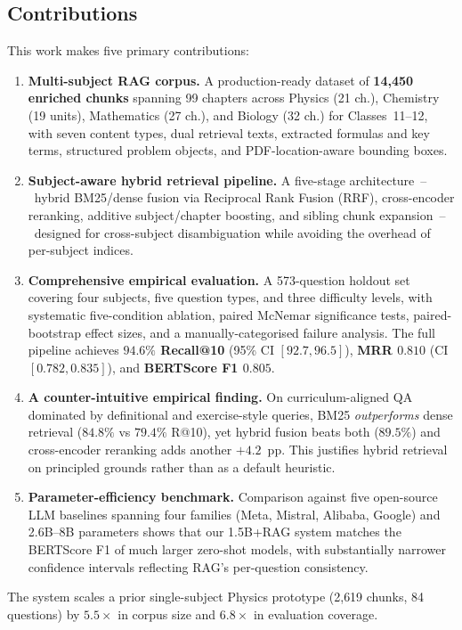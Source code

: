 \documentclass[conference]{IEEEtran}
\begin{document}
\subsection{Contributions}
This work makes five primary contributions:
\begin{enumerate}[leftmargin=*]
    \item \textbf{Multi-subject RAG corpus.} A production-ready dataset of \textbf{14{,}450 enriched chunks} spanning 99 chapters across Physics (21 ch.), Chemistry (19 units), Mathematics (27 ch.), and Biology (32 ch.) for Classes~11--12, with seven content types, dual retrieval texts, extracted formulas and key terms, structured problem objects, and PDF-location-aware bounding boxes.
    \item \textbf{Subject-aware hybrid retrieval pipeline.} A five-stage architecture~--~hybrid BM25/dense fusion via Reciprocal Rank Fusion (RRF), cross-encoder reranking, additive subject/chapter boosting, and sibling chunk expansion~--~designed for cross-subject disambiguation while avoiding the overhead of per-subject indices.
    \item \textbf{Comprehensive empirical evaluation.} A 573-question holdout set covering four subjects, five question types, and three difficulty levels, with systematic five-condition ablation, paired McNemar significance tests, paired-bootstrap effect sizes, and a manually-categorised failure analysis. The full pipeline achieves \textbf{$94.6\%$ Recall@10} (95\% CI $[92.7, 96.5]$), \textbf{MRR $0.810$} (CI $[0.782, 0.835]$), and \textbf{BERTScore F1 $0.805$}.
    \item \textbf{A counter-intuitive empirical finding.} On curriculum-aligned QA dominated by definitional and exercise-style queries, BM25 \emph{outperforms} dense retrieval ($84.8\%$ vs $79.4\%$ R@10), yet hybrid fusion beats both ($89.5\%$) and cross-encoder reranking adds another $+4.2$~pp. This justifies hybrid retrieval on principled grounds rather than as a default heuristic.
    \item \textbf{Parameter-efficiency benchmark.} Comparison against five open-source LLM baselines spanning four families (Meta, Mistral, Alibaba, Google) and 2.6B--8B parameters shows that our 1.5B+RAG system matches the BERTScore F1 of much larger zero-shot models, with substantially narrower confidence intervals reflecting RAG's per-question consistency.
\end{enumerate}

The system scales a prior single-subject Physics prototype (2{,}619 chunks, 84 questions) by $5.5\times$ in corpus size and $6.8\times$ in evaluation coverage.
\end{document}
